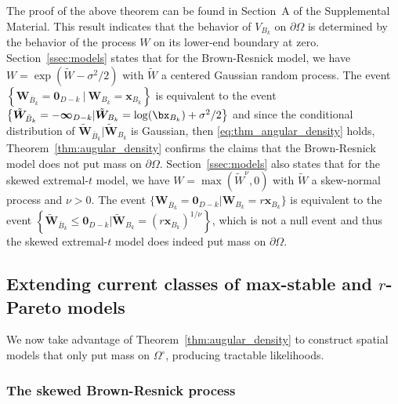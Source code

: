 \documentclass[12pt]{article}
\begin{document}
%	
The proof of the above theorem can be found in Section~A of the Supplemental Material. This result indicates that the behavior of $V_{B_k}$ on $\partial\Omega$ is determined by the behavior of the process $W$ on its lower-end boundary at zero. Section~\ref{ssec:models} states that for the Brown-Resnick model, we have $W=\exp \left(\tilde{W} - \sigma^2/2\right)$ with $\tilde W$ a centered Gaussian random process. The event $\left\{ \bm W_{\bar{B}_k}=\bm 0_{D-k} \ |\ \bm W_{B_k} = \bm x_{B_k} \right\}$ is  equivalent to the event $\left\{ \tilde{\bm W}_{\bar{B}_k} = -\bm\infty_{D-k} | \tilde{\bm W}_{B_k} = \log(\bx_{B_k}) + \sigma^2/2 \right\}$ and since the conditional distribution of $ \tilde{\bm W}_{\bar{B}_k} | \tilde{\bm W}_{B_k}$ is Gaussian, then \eqref{eq:thm_angular_density} holds, Theorem~\ref{thm:augular_density} confirms the claims that the Brown-Resnick model does not put mass on $\partial\Omega$. Section~\ref{ssec:models} also states that for the skewed extremal-$t$ model, we have $W=\max(\tilde W^\nu,0)$ with $\tilde W$ a skew-normal process and $\nu>0$. The event $\{\bm W_{\bar{B}_k} = \bm 0_{D-k} | \bm W_{B_k} = r \bm x_{B_k} \}$ is equivalent to the event $\left\{\tilde{\bm W}_{\bar{B}_k} \leq \bm 0_{D-k} | \tilde{\bm W}_{B_k} = (r \bm x_{B_k})^{1/\nu} \right\}$, which is not a null event and thus the skewed extremal-$t$ model does indeed put mass on $\partial\Omega$.

\subsection{Extending current classes of max-stable and $r$-Pareto models}
\label{ssec:new_models}

We now take advantage of Theorem~\ref{thm:augular_density} to construct spatial models that only put mass on $\Omega^\circ$, producing tractable likelihoods. 

\subsubsection{The skewed Brown-Resnick process}
\end{document}
